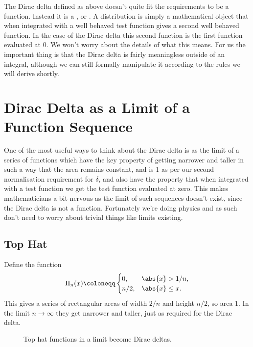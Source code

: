 \documentclass[fleqn]{NotesClass}
\begin{document}
    The Dirac delta defined as above doesn't quite fit the requirements to be a function.
    Instead it is a , or .
    A distribution is simply a mathematical object that when integrated with a well behaved test function gives a second well behaved function.
    In the case of the Dirac delta this second function is the first function evaluated at 0.
    We won't worry about the details of what this means.
    For us the important thing is that the Dirac delta is fairly meaningless outside of an integral, although we can still formally manipulate it according to the rules we will derive shortly.
    
    \section{Dirac Delta as a Limit of a Function Sequence}
    One of the most useful ways to think about the Dirac delta is as the limit of a series of functions which have the key property of getting narrower and taller in such a way that the area remains constant, and is 1 as per our second normalisation requirement for \(\delta\), and also have the property that when integrated with a test function we get the test function evaluated at zero.
    This makes mathematicians a bit nervous as the limit of such sequences doesn't exist, since the Dirac delta is not a function.
    Fortunately we're doing physics and as such don't need to worry about trivial things like limits existing.
    
    \subsection{Top Hat}
    Define the  function
    \begin{equation}
        \Pi_n(x) \coloneqq
        \begin{cases}
            0, & \abs{x} > 1/n,\\
            n/2, & \abs{x} \le x.
        \end{cases}
    \end{equation}
    This gives a series of rectangular areas of width \(2/n\) and height \(n/2\), so area \(1\).
    In the limit \(n \to \infty\) they get narrower and taller, just as required for the Dirac delta.
    
    \begin{figure}
        \caption{Top hat functions in a limit become Dirac deltas.}
    \end{figure}
    
\end{document}
